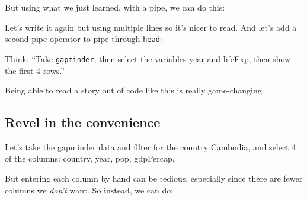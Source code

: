 \documentclass[]{book}
\newenvironment{Shaded}{\begin{snugshade}}{\end{snugshade}}
\newcommand{\KeywordTok}[1]{\textcolor[rgb]{0.13,0.29,0.53}{\textbf{{#1}}}}
\newcommand{\DecValTok}[1]{\textcolor[rgb]{0.00,0.00,0.81}{{#1}}}
\newcommand{\StringTok}[1]{\textcolor[rgb]{0.31,0.60,0.02}{{#1}}}
\newcommand{\CommentTok}[1]{\textcolor[rgb]{0.56,0.35,0.01}{\textit{{#1}}}}
\newcommand{\NormalTok}[1]{{#1}}
\theoremstyle{definition}
\theoremstyle{definition}
\theoremstyle{definition}
\theoremstyle{remark}
\begin{document}
But using what we just learned, with a pipe, we can do this:

\begin{Shaded}
\end{Shaded}

Let's write it again but using multiple lines so it's nicer to read. And
let's add a second pipe operator to pipe through \texttt{head}:

\begin{Shaded}
\end{Shaded}

Think: ``Take \texttt{gapminder}, then select the variables year and
lifeExp, then show the first 4 rows.''

Being able to read a story out of code like this is really
game-changing.

\subsection{Revel in the convenience}\label{revel-in-the-convenience}

Let's take the gapminder data and filter for the country Cambodia, and
select 4 of the columns: country, year, pop, gdpPercap.

\begin{Shaded}
\end{Shaded}

But entering each column by hand can be tedious, especially since there
are fewer columns we \emph{don't} want. So instead, we can do:

\begin{Shaded}
\end{Shaded}
\end{document}
